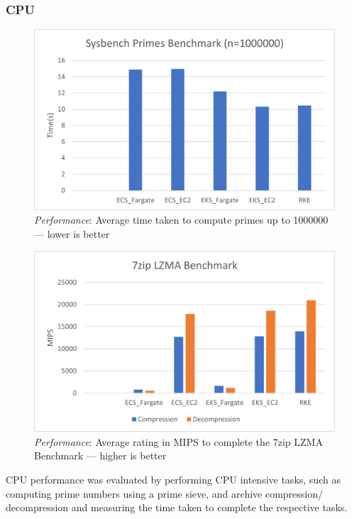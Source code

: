 \subsubsection{CPU}
\begin{figure}[htbp]
  \includegraphics[width=\textwidth]{images/perf-sysbench.png}
  \caption{\emph{Performance}: Average time taken to compute primes up to 1000000 --- lower is better }
  \label{fig:perf_sysbench}
\end{figure}

\begin{figure}[htbp]
  \includegraphics[width=\textwidth]{images/perf-7zip.png}
  \caption{\emph{Performance}: Average rating in MIPS to complete the 7zip LZMA Benchmark --- higher is better}
  \label{fig:perf_7zip}
\end{figure}

CPU performance was evaluated by performing CPU intensive tasks, such as computing prime numbers using a prime sieve,
and archive compression/ decompression and measuring the time taken to complete the respective tasks.

